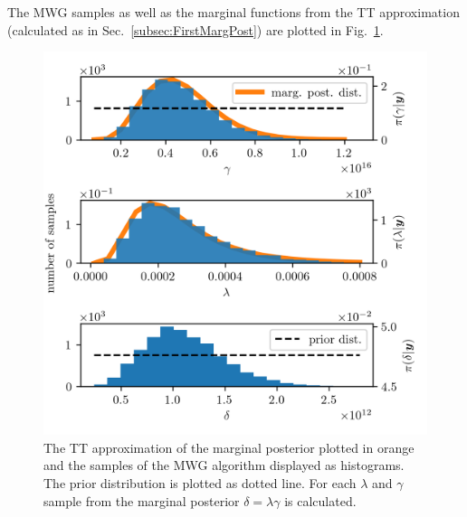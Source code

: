 The MWG samples as well as the marginal functions from the TT approximation (calculated as in Sec.~\ref{subsec:FirstMargPost}) are plotted in Fig.~\ref{fig:MargPostHistTT}.
\begin{figure}[ht!]
	\centering
	\includegraphics{secMargO3Res.png}
	\caption[Marginal posterior histograms and TT approximation as well as hyper-prior distribution.]{The TT approximation of the marginal posterior plotted in orange and the samples of the MWG algorithm displayed as histograms. The prior distribution is plotted as dotted line. For each $\lambda$ and $\gamma$ sample from the marginal posterior $\delta = \lambda \gamma$ is calculated.}
	\label{fig:MargPostHistTT}
\end{figure}
\clearpage

